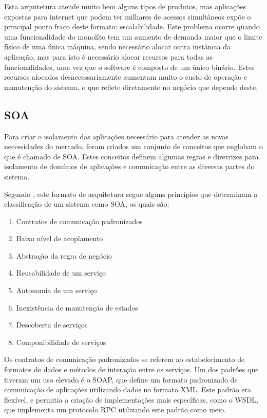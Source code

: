 Esta arquitetura atende muito bem alguns tipos de produtos, mas aplicações
expostas para internet que podem ter milhares de acessos simultâneos expõe o
principal ponto fraco deste formato: escalabilidade. Este problema ocorre
quando uma funcionalidade do monolíto tem um aumento de demanda maior que o
limite físico de uma única máquina, sendo necessário alocar outra instância
da aplicação, mas para isto é necessário alocar recursos para todas as
funcionalidades, uma vez que o software é composto de um único binário. Estes
recursos alocados desnecessariamente aumentam muito o custo de operação e
manutenção do sistema, o que reflete diretamente no negócio que depende deste.

\subsection{SOA}

Para criar o isolamento das aplicações necessário para atender as novas
necessidades do mercado, foram criados um conjunto de conceitos que englobam o
que é chamado de \ac{SOA}. Estes conceitos definem algumas regras e diretrizes
para isolamento de domínios de aplicações e comunicação entre as diversas partes
do sistema.

Segundo , este formato de arquitetura segue alguns
princípios que determinam a classificação de um sistema como \ac{SOA},
os quais são:

\begin{enumerate}
  \item Contratos de comunicação padronizados
  \item Baixo nível de acoplamento
  \item Abstração da regra de negócio
  \item Reusabilidade de um serviço
  \item Autonomia de um serviço
  \item Inexistência de manutenção de estados
  \item Descoberta de serviços
  \item Componibilidade de serviços
\end{enumerate}

Os contratos de comunicação padronizados se referem ao estabelecimento de
formatos de dados e métodos de interação entre os serviços. Um dos padrỗes
que tiveram um uso elevado é o \ac{SOAP}, que define um formato padronizado
de comunicação de aplicações utilizando dados no formato \ac{XML}. Este padrão
era flexível, e permitia a criação de implementações mais específicas, como o
\ac{WSDL}, que implementa um protocolo \ac{RPC} utilizando este padrão como
meio.

